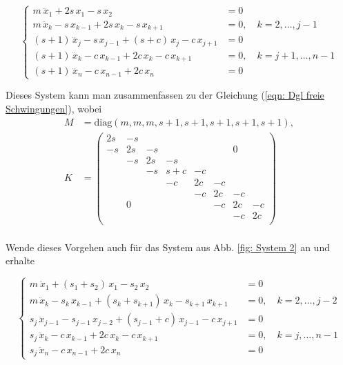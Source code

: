 \documentclass[a4paper,12pt]{report}
\newcommand{\diag}{\text{diag}}
\newcommand{\1}{\mathds{1}}
\theoremstyle{plain} %
\theoremstyle{definition} %
\theoremstyle{remark}
\begin{document}
            $$\begin{cases}
                  m\ \ddot x_1 + 2s\,x_1 - s\,x_2 & = 0   \\
                  m\,\ddot x_k -s\,x_{k-1} + 2s\,x_k -s\,x_{k+1} & = 0,\quad k=2,\dots,j-1\\
                  (s+1)\,\ddot x_j -s\,x_{j-1} + (s+c)\,x_j -c\,x_{j+1} & = 0\\
                  (s+1)\,\ddot x_k -c\,x_{k-1} + 2c\,x_k -c\,x_{k+1} & = 0,\quad k=j+1,\dots,n-1\\
                  (s+1)\,\ddot x_n -c\,x_{n-1}+ 2c\,x_n & = 0
            \end{cases}$$

            Dieses System kann man zusammenfassen zu der Gleichung (\ref{eqn: Dgl freie Schwingungen}),
            wobei
            \begin{align}
                  M &= \diag(m, m, m, s+1, s+1,s+1, s+1,  s+1),\label{def: M1}\\
                  K &= \begin{pmatrix}
                        2s & -s &  &  &  &  &  &  \\
                        -s &  2s& -s &  &  &  &0  &  \\
                         & -s & 2s & -s &  &  &  &  \\
                         &  & -s & s+c & -c &  &  &  \\
                         &  &  & -c & 2c & -c &  &  \\
                         &  &  &  & -c & 2c & -c &  \\
                         & 0 &  &  &  & -c & 2c &  -c\\
                         &  &  &  &  &  & -c & 2c \\
                        \end{pmatrix}\label{def: K1}
            \end{align}\\

            Wende dieses Vorgehen auch für das System aus Abb. \ref{fig: System 2} an und erhalte
            
            $$\begin{cases}
                  m\ \ddot x_1 + (s_1+s_2)\,x_1 - s_2\,x_2 & = 0   \\
                  m\,\ddot x_k -s_k\,x_{k-1} + (s_k+s_{k+1})\,x_k -s_{k+1}\,x_{k+1} & = 0,\quad k=2,\dots,j-2\\
                  s_j\,\ddot x_{j-1} -s_{j-1}\,x_{j-2} + (s_{j-1}+c)\,x_{j-1} -c\,x_{j+1} & = 0\\
                  s_j\,\ddot x_k -c\,x_{k-1} + 2c\,x_k -c\,x_{k+1} & = 0,\quad k=j,\dots,n-1\\
                  s_j\,\ddot x_n -c\,x_{n-1}+ 2c\,x_n & = 0
            \end{cases}$$
            
\end{document}
